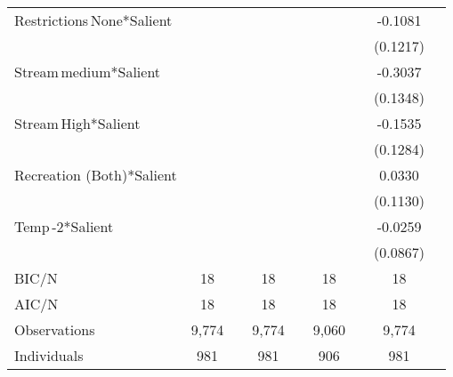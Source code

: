 {\begin{tabular}{l*{8}{c}}
Restrictions\,None*Salient&                  &                  &                  &                  &                  &                  &  -0.1081         &                  \\
                &                  &                  &                  &                  &                  &                  & (0.1217)         &                  \\
Stream\,medium*Salient&                  &                  &                  &                  &                  &                  &  -0.3037\sym{**} &                  \\
                &                  &                  &                  &                  &                  &                  & (0.1348)         &                  \\
Stream\,High*Salient&                  &                  &                  &                  &                  &                  &  -0.1535         &                  \\
                &                  &                  &                  &                  &                  &                  & (0.1284)         &                  \\
Recreation (Both)*Salient&                  &                  &                  &                  &                  &                  &   0.0330         &                  \\
                &                  &                  &                  &                  &                  &                  & (0.1130)         &                  \\
Temp\,-2*Salient &                  &                  &                  &                  &                  &                  &  -0.0259         &                  \\
                &                  &                  &                  &                  &                  &                  & (0.0867)         &                  \\
\hline
BIC/N           &       18         &                  &       18         &                  &       18         &                  &       18         &                  \\
AIC/N           &       18         &                  &       18         &                  &       18         &                  &       18         &                  \\
Observations    &    9,774         &                  &    9,774         &                  &    9,060         &                  &    9,774         &                  \\
Individuals     &      981         &                  &      981         &                  &      906         &                  &      981         &                  \\
\hline\hline
\end{tabular}
}
